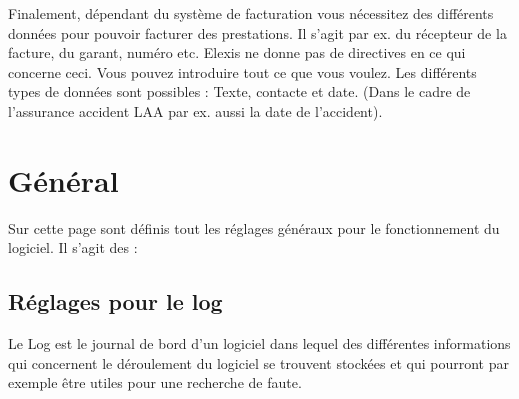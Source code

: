 Finalement, dépendant du système de facturation vous nécessitez des différents données pour pouvoir facturer des prestations. Il s'agit par ex. du récepteur de la facture, du garant, numéro etc.
Elexis ne donne pas de directives en ce qui concerne ceci. Vous pouvez introduire tout ce que vous voulez. Les différents types de données sont possibles : Texte, contacte et date. (Dans le cadre de l'assurance accident LAA par ex. aussi la \glqq date de l'accident\grqq{}).\\


\section{Général}
Sur cette page sont définis tout les réglages généraux pour le fonctionnement du logiciel.
Il s'agit des :
\subsection{Réglages pour le log}
Le \glqq Log\grqq{} est le journal de bord d'un logiciel dans lequel des différentes informations qui concernent le déroulement du logiciel se trouvent stockées et qui pourront par exemple être utiles pour une recherche de faute.

